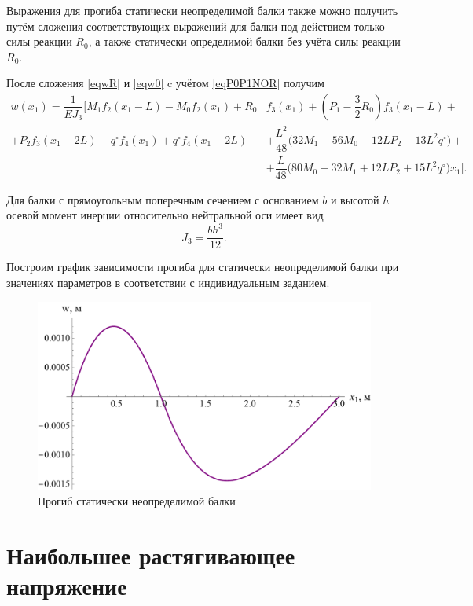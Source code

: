 \documentclass[12pt, a4paper]{article}
\begin{document}
Выражения для прогиба статически неопределимой балки также можно получить путём сложения соответствующих выражений для балки под действием только силы реакции $R_0$, а также статически определимой балки без учёта силы реакции $R_0$. 

После сложения \eqref{eqwR} и \eqref{eqw0} c учётом \eqref{eqP0P1NOR} получим
\vspace{-0.25em}
\begin{equation*}
	\begin{split}
		w(x_1) = \dfrac{1}{E J_3} \bigg[ M_1 f_2(x_1 - L) - M_0 f_2(x_1) + R_0 & f_3(x_1) + \left( P_1 - \dfrac{3}{2} R_0 \right) f_3(x_1 - L) + \\ + P_2 f_3(x_1 - 2L) - q^{\circ} f_4(x_1) + q^{\circ} f_4(x_1 - 2L) & + \dfrac{L^2}{48} \big( 32 M_1 - 56 M_0 - 12L P_2 - 13L^2 q^{\circ} \big) + \\ & + \dfrac{L}{48} \big( 80 M_0 - 32 M_1 + 12L P_2 + 15 L^2 q^{\circ} \big) x_1 \bigg].
	\end{split}
\end{equation*}

\newpage

Для балки с прямоугольным поперечным сечением с основанием $b$ и высотой $h$ осевой момент инерции относительно нейтральной оси имеет вид
\[
J_3 = \dfrac{b h^3}{12}.
\]

Построим график зависимости прогиба для статически неопределимой балки при значениях параметров в соответствии с индивидуальным заданием.

\begin{figure}[!h]
	\centering
	\includegraphics[width=0.75\linewidth]{plot-12}
	\caption{Прогиб статически неопределимой балки}
\end{figure}

\section{Наибольшее растягивающее напряжение}
\end{document}
